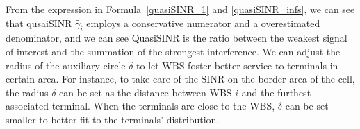 From the expression in Formula~\ref{quasiSINR_1} and \ref{quasiSINR_infs}, we can see that qusaiSINR $\tilde{\gamma_{i}}$ employs a conservative numerator and a overestimated denominator, and we can see QuasiSINR is the ratio between the weakest signal of interest and the summation of the strongest interference.
We can adjust the radius of the auxiliary circle $\delta$ to let WBS foster better service to terminals in certain area.
For instance, to take care of the SINR on the border area of the cell, the radius $\delta$ can be set as the distance between WBS $i$ and the furthest associated terminal.
When the terminals are close to the WBS, $\delta$ can be set smaller to better fit to the terminals' distribution.


